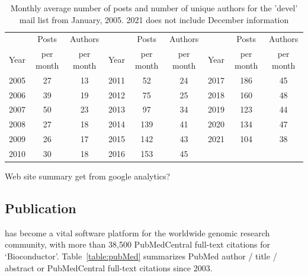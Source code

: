 \documentclass[letterpaper]{article}
\begin{document}
\begin{table}
\begin{center}
\caption{Monthly average number of posts and number of unique authors
  for the \Bioconductor{} 'devel' mail list from January, 2005. 2021 does not
  include December information}
\label{tbl:av_posts}
\begin{tabular}{lcc|lcc|lcc}
  \\
       & Posts     & Authors   &      & Posts     & Authors   &      & Posts     & Authors\\
  Year & per month & per month & Year & per month & per month & Year & per month & per month\\
  \hline\noalign{\smallskip}
  2005 & 27        & 13        & 2011 & 52        & 24        & 2017 & 186 & 45 \\
  2006 & 39        & 19        & 2012 & 75        & 25        & 2018 & 160 & 48 \\
  2007 & 50        & 23        & 2013 & 97        & 34        & 2019 & 123 & 44 \\
  2008 & 27        & 18        & 2014 & 139       & 41        & 2020 & 134 & 47 \\
  2009 & 26        & 17        & 2015 & 142       & 43        & 2021 & 104 & 38 \\
  2010 & 30        & 18        & 2016 & 153       & 45\\
\end{tabular}
\end{center}
\end{table}


Web site summary get from google analytics?





\subsection{Publication}

\Bioconductor{} has become a vital software platform for the worldwide
genomic research community, with more than 38,500 PubMedCentral
full-text citations for `Bioconductor'. Table~\ref{table:pubMed}
summarizes PubMed author / title / abstract or PubMedCentral full-text
citations since 2003.
\end{document}
